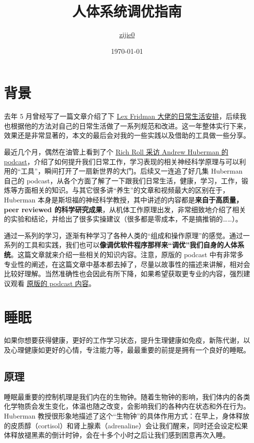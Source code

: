 \documentclass{report}
\title{人体系统调优指南}
\author{\href{https://github.com/zijie0}{zijie0}}
\date{\today}
\begin{document}
\maketitle

\tableofcontents
\newpage

\chapter{背景}

去年 5 月曾经写了一篇文章介绍了下 \href{https://zhuanlan.zhihu.com/p/371254789}{Lex Fridman 大佬的日常生活安排}，后续我也根据他的方法对自己的日常生活做了一系列规范和改进。这一年整体实行下来，效果还是非常显著的，本文的最后会对我的一些实践以及借助的工具做一些分享。

最近几个月，偶然在油管上看到了个 \href{https://youtu.be/2ekdc6jCu2E}{Rich Roll 采访 Andrew Huberman 的 podcast}，介绍了如何提升我们日常工作，学习表现的相关神经科学原理与可以利用的“工具”，瞬间打开了一扇新世界的大门。后续又一连追了好几集 Huberman 自己的 podcast，从各个方面了解了一下跟我们日常生活，健康，学习，工作，锻炼等方面相关的知识。与其它很多讲“养生”的文章和视频最大的区别在于，Huberman 本身是斯坦福的神经科学教授，其中讲述的内容都是\textbf{来自于高质量，peer reviewed 的科学研究成果}，从机体工作原理出发，非常细致地介绍了相关的实验和结论，并给出了很多实操建议（很多都是零成本，不是搞推销的……）。

通过一系列的学习，逐渐有种学习了各种人类的“组成和操作原理”的感觉。通过一系列的工具和实践，我们也可以\textbf{像调优软件程序那样来“调优”我们自身的人体系统}。这篇文章就来介绍一些相关的知识内容。注意，原版的 podcast 中有非常多专业性的阐述，在这篇文章中基本都去掉了，尽量以故事性的描述来讲解，相对会比较好理解。当然准确性也会因此有所下降，如果希望获取更专业的内容，强烈建议观看 \href{https://hubermanlab.com/}{原版的 podcast 内容}。

\chapter{睡眠}

如果你想要获得健康，更好的工作学习状态，提升生理健康如免疫，新陈代谢，以及心理健康如更好的心情，专注能力等，最最重要的前提是拥有一个良好的睡眠。

\section{原理}

睡眠最重要的控制机理是我们内在的生物钟。随着生物钟的影响，我们体内的各类化学物质会发生变化，体温也随之改变，会影响我们的各种内在状态和外在行为。Huberman 教授很形象地描述了这个“生物钟”的具体作用方式：在早上，身体释放的皮质醇（cortisol）和肾上腺素（adrenaline）会让我们醒来，同时还会设定松果体释放褪黑素的倒计时钟，会在十多个小时之后让我们感到困意再次入睡。
\end{document}
